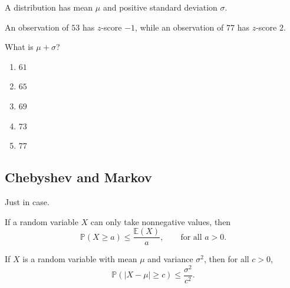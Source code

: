 \begin{exercise}
A distribution has mean $\mu$ and
positive standard deviation $\sigma$.

An observation of $53$ has $z$-score $-1$,
while an observation of $77$ has
$z$-score $2$.

What is $\mu+\sigma$?

\begin{enumerate}[label=(\Alph*)]
\item $61$
\item $65$
\item $69$
\item $73$
\item $77$
\end{enumerate}
\end{exercise}


\subsection{Chebyshev and Markov}

Just in case.

\begin{theorem}
If a random variable $X$ can only take nonnegative values, then
\[
\mathbb{P}(X\geq a)\leq\frac{\mathbb{E}(X)}{a},
\qquad \text{for all }a>0.
\]
\end{theorem}

\begin{theorem}
If $X$ is a random variable with mean $\mu$ and variance $\sigma^2$, then for all $c>0$,
\[
\mathbb{P}(|X-\mu|\geq c)\leq\frac{\sigma^2}{c^2}.
\]
\end{theorem}




